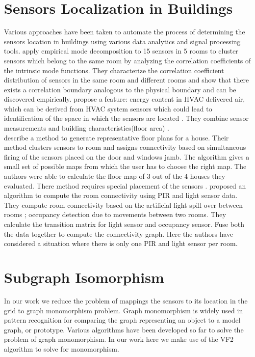 \section{Sensors Localization in Buildings} 
Various approaches have been taken to automate the process of determining the sensors location in buildings using various data analytics and signal processing tools. \citeauthor{Hong:2013:TAS:2528282.2528302}\cite{Hong:2013:TAS:2528282.2528302} apply empirical mode decomposition to 15 sensors in 5 rooms to cluster sensors which belong to the same room by analyzing the correlation coefficients of the intrinsic mode functions. They characterize the correlation coefficient distribution of sensors in the same room and different rooms and show that there exists a correlation boundary analogous to the physical boundary and can be discovered empirically. \cite{doi:10.1061/9780784413616.226} \citeauthor{doi:10.1061/9780784413616.226} propose a feature: energy content in HVAC delivered air, which can be derived from HVAC system sensors which could lead to identification of the space in which the sensors are located . They combine sensor measurements and building characteristics(floor area) .\\ \citeauthor{Lu:2014:SBS:2648771.2629441}\cite{Lu:2014:SBS:2648771.2629441} describe a method to generate representative floor plans for a house. Their method clusters sensors to room and assigns connectivity based on simultaneous firing of the sensors placed on the door and windows jamb. The algorithm gives a small set of possible maps from which the user has to choose the right map. The authors were able to calculate the floor map of 3 out of the 4 houses they evaluated.  There method requires special placement of the sensors .
 \citeauthor{ellis2012creating}\cite{ellis2012creating} proposed an algorithm to compute the room connectivity using  PIR and light sensor data. They compute room connectivity based on the artificial light spill over between rooms ; occupancy detection due to movements between two rooms. They calculate the transition matrix for light sensor and occupancy sensor. Fuse both the data together to compute the connectivity graph. Here the authors have considered a situation where there is only one PIR and light sensor per room.


\section{Subgraph Isomorphism}
In our work we reduce the problem of mappings the sensors to its location in the grid to graph monomorphism problem. Graph monomorphism is widely used in pattern recognition for comparing the graph representing an object to a model  graph, or prototype. Various algorithms have been developed so far to solve the problem of graph monomorphism. In our work here we make use of the VF2\cite{cordella2001improved} algorithm to solve for monomorphism.